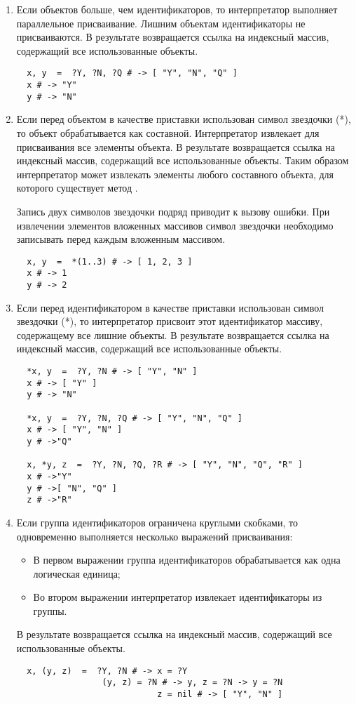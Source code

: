\begin{enumerate}
  \item Если объектов больше, чем идентификаторов, то интерпретатор выполняет параллельное присваивание. Лишним объектам идентификаторы не присваиваются. В результате возвращается ссылка на индексный массив, содержащий все использованные объекты.
  \begin{verbatim}
  x, y  =  ?Y, ?N, ?Q # -> [ "Y", "N", "Q" ]
  x # -> "Y"
  y # -> "N"
  \end{verbatim}

  \item Если перед объектом в качестве приставки использован символ звездочки (*), то объект обрабатывается как составной. Интерпретатор извлекает для присваивания все элементы объекта. В результате возвращается ссылка на индексный массив, содержащий все использованные объекты. Таким образом интерпретатор может извлекать элементы любого составного объекта, для которого существует метод .

  Запись двух символов звездочки подряд приводит к вызову ошибки. При извлечении элементов вложенных массивов символ звездочки необходимо записывать перед каждым вложенным массивом.
  \begin{verbatim}
  x, y  =  *(1..3) # -> [ 1, 2, 3 ]
  x # -> 1
  y # -> 2
  \end{verbatim}

  \item Если перед идентификатором в качестве приставки использован символ звездочки (*), то интерпретатор присвоит этот идентификатор массиву, содержащему все лишние объекты. В результате возвращается ссылка на индексный массив, содержащий все использованные объекты.
  \begin{verbatim}
  *x, y  =  ?Y, ?N # -> [ "Y", "N" ]
  x # -> [ "Y" ]
  y # -> "N"

  *x, y  =  ?Y, ?N, ?Q # -> [ "Y", "N", "Q" ]
  x # -> [ "Y", "N" ]
  y # ->"Q"

  x, *y, z  =  ?Y, ?N, ?Q, ?R # -> [ "Y", "N", "Q", "R" ]
  x # ->"Y"
  y # ->[ "N", "Q" ]
  z # ->"R"
  \end{verbatim}

  \item Если группа идентификаторов ограничена круглыми скобками, то одновременно выполняется несколько выражений присваивания:
  \begin{itemize}
    \item В первом выражении группа идентификаторов обрабатывается как одна логическая единица;
    \item Во втором выражении интерпретатор извлекает идентификаторы из группы.
  \end{itemize}

  В результате возвращается ссылка на индексный массив, содержащий все использованные объекты.
  \begin{verbatim}
  x, (y, z)  =  ?Y, ?N # -> x = ?Y
  		         (y, z) = ?N # -> y, z = ?N -> y = ?N
  						    z = nil # -> [ "Y", "N" ]
  \end{verbatim}
\end{enumerate}